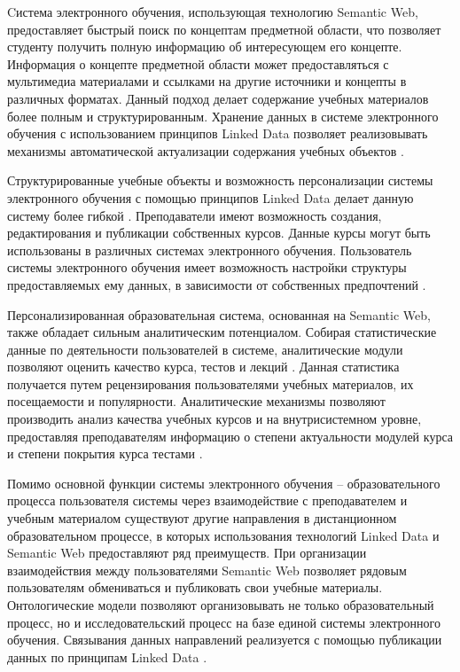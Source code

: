 Cистема электронного обучения, использующая технологию Semantic Web, предоставляет быстрый поиск по концептам предметной области, что позволяет студенту получить полную информацию об интересующем его концепте. Информация о концепте предметной области может предоставляться с мультимедиа материалами и ссылками на другие источники и концепты в различных форматах. Данный подход делает содержание учебных материалов более полным и структурированным. Хранение данных в системе электронного обучения с использованием принципов Linked Data позволяет реализовывать механизмы автоматической актуализации содержания учебных объектов \cite{mohan2003learning}. 

Структурированные учебные объекты и возможность персонализации системы электронного обучения с помощью принципов Linked Data делает данную систему более гибкой \cite{nilsson2002semantic}. Преподаватели имеют возможность создания, редактирования и публикации собственных курсов. Данные курсы могут быть использованы в различных системах электронного обучения. Пользователь системы электронного обучения имеет возможность настройки структуры предоставляемых ему данных, в зависимости от собственных предпочтений \cite{koper2004use}.  





Персонализированная образовательная система, основанная на Semantic Web, также обладает сильным аналитическим потенциалом.  Собирая статистические данные по деятельности пользователей в системе, аналитические модули позволяют оценить качество курса, тестов и лекций \cite{aroyo2004new}. Данная статистика получается путем рецензирования пользователями учебных материалов, их посещаемости и популярности. Аналитические механизмы позволяют производить анализ качества учебных курсов и на внутрисистемном уровне, предоставляя преподавателям информацию о степени актуальности модулей курса и степени покрытия курса тестами \cite{puustjarvi2004integrating}.

Помимо основной функции системы электронного обучения – образовательного процесса  пользователя системы через взаимодействие с преподавателем и учебным материалом существуют другие направления в дистанционном образовательном процессе, в которых использования технологий Linked Data и Semantic Web предоставляют ряд преимуществ. При организации взаимодействия между пользователями Semantic Web позволяет рядовым пользователям обмениваться и публиковать свои учебные материалы. Онтологические модели позволяют организовывать не только образовательный процесс, но и исследовательский процесс на базе единой системы электронного обучения. Связывания данных направлений реализуется с помощью публикации данных по принципам Linked Data \cite{white2013conceptual}. 

